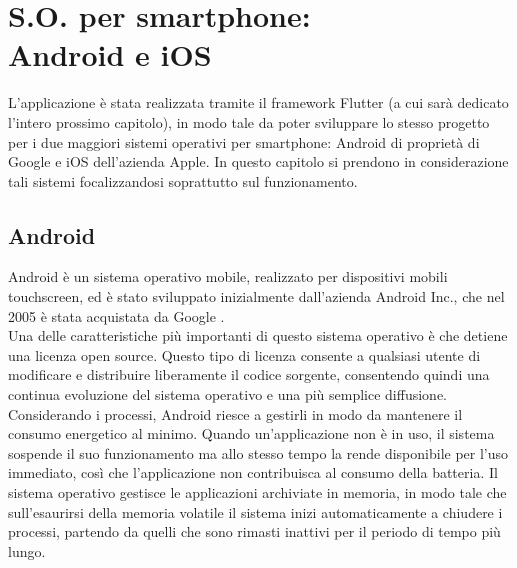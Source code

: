 \chapter{S.O. per smartphone:\\Android e iOS}
L'applicazione è stata realizzata tramite il framework Flutter (a cui sarà
dedicato l'intero prossimo capitolo), in modo tale da poter sviluppare lo stesso
progetto per i due maggiori sistemi operativi per smartphone: Android di
proprietà di Google e iOS dell'azienda Apple. In questo capitolo si prendono in
considerazione tali sistemi focalizzandosi soprattutto sul funzionamento.

\section{Android}
Android è un sistema operativo mobile, realizzato per dispositivi mobili
touchscreen, ed è stato sviluppato inizialmente dall'azienda Android Inc., che
nel 2005 è stata acquistata da Google \cite{3}.\\
Una delle caratteristiche più importanti di questo sistema operativo è che
detiene una licenza open source. Questo tipo di licenza consente a
qualsiasi utente di modificare e distribuire liberamente il codice
sorgente, consentendo quindi una continua evoluzione del sistema operativo e una
più semplice diffusione. Considerando i processi, Android riesce a gestirli in
modo da mantenere il consumo energetico al minimo. Quando un’applicazione non è
in uso, il sistema sospende il suo funzionamento ma allo stesso tempo la rende
disponibile per l’uso immediato, così che l’applicazione non contribuisca
al consumo della batteria. Il sistema operativo gestisce le applicazioni archiviate in
memoria, in modo tale che sull'esaurirsi della memoria volatile il sistema inizi
automaticamente a chiudere i processi, partendo da quelli che sono rimasti
inattivi per il periodo di tempo più lungo.

